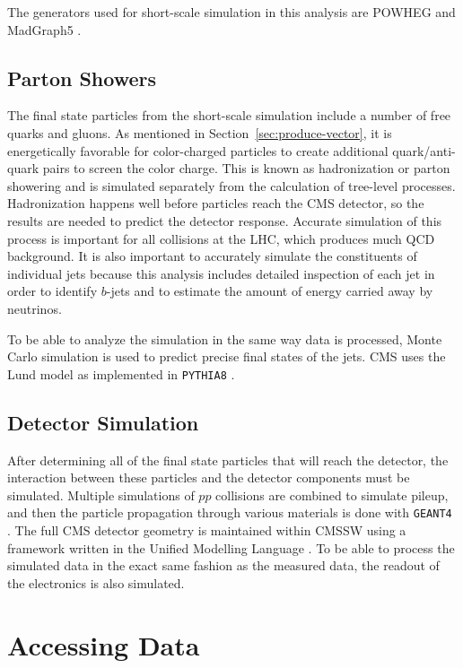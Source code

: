 The generators used for short-scale simulation in this analysis
are POWHEG \cite{Oleari_2010} and MadGraph5 \cite{hirschi2015automated}.

\subsection{Parton Showers}

The final state particles from the short-scale simulation
include a number of free quarks and gluons.
As mentioned in Section~\ref{sec:produce-vector},
it is energetically favorable for color-charged particles to create additional
quark/anti-quark pairs to screen the color charge.
This is known as hadronization or parton showering and
is simulated separately from the calculation of tree-level processes.
Hadronization happens well before particles reach the CMS detector,
so the results are needed to predict the detector response.
Accurate simulation of this process is important for all collisions at the LHC,
which produces much QCD background.
It is also important to accurately simulate the constituents of individual jets
because this analysis includes detailed inspection of each jet
in order to identify $b$-jets and to estimate the amount of energy carried away by neutrinos.

To be able to analyze the simulation in the same way data is processed,
Monte Carlo simulation is used to predict precise final states of the jets.
CMS uses the Lund model \cite{ANDERSSON198331} as implemented in
\texttt{PYTHIA8} \cite{SJOSTRAND2015159}.

\subsection{Detector Simulation}

After determining all of the final state particles that will reach the detector,
the interaction between these particles and the detector components must be simulated.
Multiple simulations of $pp$ collisions are combined to simulate pileup,
and then the particle propagation through various materials is done with
\texttt{GEANT4} \cite{AGOSTINELLI2003250}.
The full CMS detector geometry is maintained within CMSSW \cite{Hildreth_2015}
using a framework written in the Unified Modelling Language \cite{Lefebure:687188}.
To be able to process the simulated data in the exact same fashion as the measured data,
the readout of the electronics is also simulated.

\section{Accessing Data} \label{sec:accessing-data}

